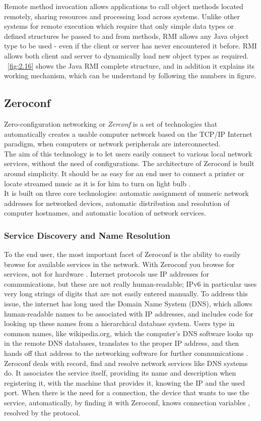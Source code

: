 Remote method invocation allows applications to call object methods located remotely, sharing resources and processing load across systems. Unlike other systems for remote execution which require that only simple data types or defined structures be passed to and from methods, RMI allows any Java object type to be used - even if the client or server has never encountered it before. RMI allows both client and server to dynamically load new object types as required.
\figurename~\ref{fig:2.16} shows the Java RMI complete structure, and in addition it explains its working mechanism, which can be understand by following the numbers in figure.
\subsection{Zeroconf}\label{zeroconf} Zero-configuration networking or \textit{Zerconf} is a set of technologies that automatically creates a usable computer network based on the TCP/IP Internet paradigm, when computers or network peripherals are interconnected. \\
The aim of this technology is to let users easily connect to various local network services, without the need of configurations. The architecture of Zeroconf is built around simplicity. It should be as easy for an end user to connect a printer or locate streamed music as it is for him to turn on light bulb \cite{cheshire2006zero}.\\
It is built on three core technologies: automatic assignment of numeric network addresses for networked devices, automatic distribution and resolution of computer hostnames, and automatic location of network services.\\

\subsubsection{Service Discovery and Name Resolution}
To the end user, the most important facet of Zeroconf is the ability to easily browse for available services in the network. With Zeroconf you browse for services, not for hardware \cite{cheshire2006zero}. Internet protocols use IP addresses for communications, but these are not really human-readable; IPv6 in particular uses very long strings of digits that are not easily entered manually. To address this issue, the internet has long used the Domain Name System (DNS), which allows human-readable names to be associated with IP addresses, and includes code for looking up these names from a hierarchical database system. Users type in common names, like wikipedia.org, which the computer's DNS software looks up in the remote DNS databases, translates to the proper IP address, and then hands off that address to the networking software for further communications \cite{marshall2011how}. Zeroconf deals with record, find and resolve network services like DNS systems do. It associates the service itself, providing its name and description when registering it, with the machine that provides it, knowing the IP and the used port. When there is the need for a connection, the device that wants to use the service, automatically, by finding it with Zeroconf, knows connection variables , resolved by the protocol.
